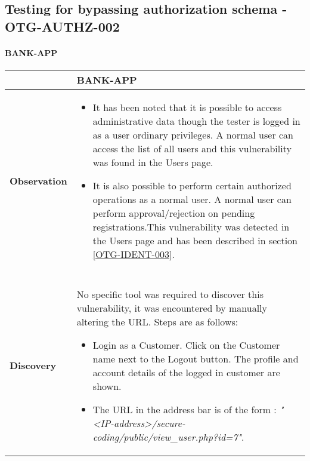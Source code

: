 \subsection{Testing for bypassing authorization schema - OTG-AUTHZ-002} \label{OTG-AUTHZ-002}

\paragraph{BANK-APP} \mbox{}
\begin{longtable*}{p{.20\textwidth} | p{.80\textwidth}}
    \hline
    & \textbf{BANK-APP} \\
    \hline
    \textbf{Observation} &
   \begin {itemize}
   	\item It has been noted that it is possible to access administrative data though the tester is logged in as a user ordinary privileges. A normal user can access the list of all users and this vulnerability was found in the Users page.

   \item It is also possible to perform certain authorized operations as a normal user. A normal user can perform approval/rejection on pending registrations.This vulnerability was detected in the Users page and has been described in section \ref{OTG-IDENT-003}.

   \end{itemize}
    \\\\
    \textbf{Discovery} &
       No specific tool was required to discover this vulnerability, it was encountered by manually altering the URL. Steps are as follows:
          \begin{itemize}
      	    \item Login as a Customer. Click on the Customer name next to the Logout button. The profile and account details of the logged in customer are shown.

      	    \item The URL in the address bar is of the form : \textit{"<IP-address>/secure-coding/public/view\_user.php?id=7"}.


\end{itemize}
\end{longtable*}
